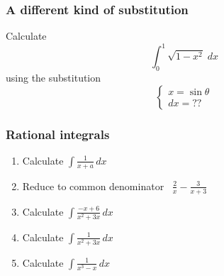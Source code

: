 \documentclass[14pt]{beamer}
\begin{document}
	\begin{frame}[t]
		\frametitle{A different kind of substitution}

		Calculate
		\[
			\int_{0}^{1}\sqrt{1 - x^{2}}\; dx
		\]
		using the substitution
		\[
			\begin{cases}
				x = \sin \theta \\
				dx = ??
			\end{cases}
		\]
	\end{frame}





	\begin{frame}[t]
		\fontsize{13}{13}\selectfont
		\frametitle{Rational integrals}

		\begin{enumerate}
			\item Calculate $\displaystyle \int \frac{1}{x+a}\, dx$
				\vspace{.2cm}

			\item Reduce to common denominator \, $\displaystyle \frac{2}{x}- \frac{3}{x+3}$
				\vspace{.2cm}

			\item Calculate $\displaystyle \int \frac{-x + 6}{x^{2}+ 3x}\, dx$
				\vspace{.2cm}

			\item Calculate $\displaystyle \int \frac{1}{x^{2}+ 3x}\, dx$
				\vspace{.2cm}

			\item Calculate $\displaystyle \int \frac{1}{x^{3}-x}\, dx$
		\end{enumerate}
	\end{frame}
\end{document}
